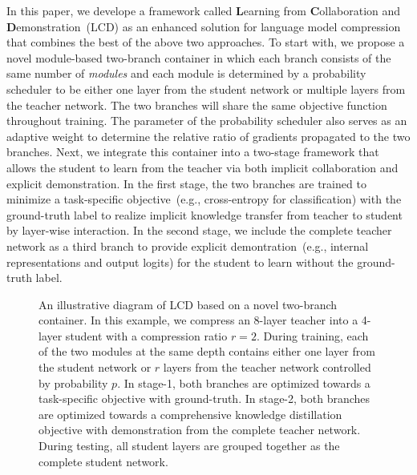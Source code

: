 In this paper, we develope a framework called \textbf{L}earning from \textbf{C}ollaboration and \textbf{D}emonstration~(LCD) as an enhanced solution for language model compression that 
combines the best of the above two approaches. To start with, we propose a novel module-based two-branch container in which each branch consists of the same number of \textit{modules} and each module is determined by a probability scheduler to be either  
one layer from the student network or multiple layers from the teacher network. The two branches will share the same objective function throughout training. The parameter of the probability scheduler also serves as an adaptive weight to determine the relative ratio of gradients propagated to the two branches. Next, we integrate this container into a two-stage framework that allows the student to learn from the teacher via both implicit collaboration and explicit demonstration. 
In the first stage, the two branches are trained to minimize a task-specific objective~(e.g., cross-entropy for classification) with the ground-truth label to realize implicit knowledge transfer from teacher to student by layer-wise interaction. In the 
second stage, we include the complete teacher network as a third branch to provide explicit demontration~(e.g., internal representations and output logits) for the student to learn without the ground-truth label. 

\begin{figure}[th!]
    \centering
    \caption{An illustrative diagram of LCD based on a novel two-branch container. In this example, we compress an 8-layer teacher into a 4-layer student with a compression ratio $r=2$. During training, each of the two modules at the same depth
    contains either one layer from the student network or $r$ layers from the teacher network controlled by probability $p$. In stage-1, both branches are optimized towards a task-specific objective with ground-truth. In stage-2, both branches are optimized towards a comprehensive knowledge distillation objective with demonstration from the complete teacher network. During testing, all student layers are grouped together as the complete student network.} 
    \label{fig:overview}
\end{figure}


